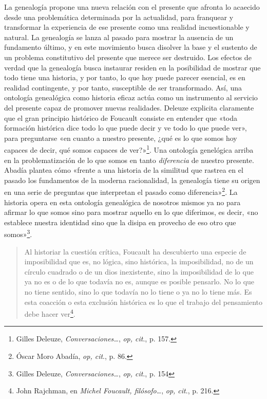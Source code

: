 La genealogía propone una nueva relación con el presente que afronta lo acaecido desde una problemática determinada por la actualidad, para franquear y transformar la experiencia de ese presente como una realidad incuestionable y natural. La genealogía se lanza al pasado para mostrar la ausencia de un fundamento último, y en este movimiento busca disolver la base y el sustento de un problema constitutivo del presente que merece ser destruido. Los efectos de verdad que la genealogía busca instaurar residen en la posibilidad de mostrar que todo tiene una historia, y por tanto, lo que hoy puede parecer esencial, es en realidad contingente, y por tanto, susceptible de ser transformado. Así, una ontología genealógica como historia eficaz actúa como un instrumento al servicio del presente capaz de promover nuevas realidades. Deleuze explicita claramente que el gran principio histórico de Foucault consiste en entender que «toda formación histórica dice todo lo que puede decir y ve todo lo que puede ver», para preguntarse «en cuanto a nuestro presente, ¿qué es lo que somos hoy capaces de decir, qué somos capaces de ver?»\footnote{Gilles Deleuze, \emph{Conversaciones\ldots{}}, \emph{op, cit}., p. 157.}. Una ontología genelógica arriba en la problematización de lo que somos en tanto \emph{diferencia} de nuestro presente. Abadía plantea cómo «frente a una historia de la similitud que rastrea en el pasado los fundamentos de la moderna racionalidad, la genealogía tiene su origen en una serie de preguntas que interpretan el pasado como diferencia»\footnote{Óscar Moro Abadía, \emph{op, cit}., p. 86.}. La historia opera en esta ontología genealógica de nosotros mismos ya no para afirmar lo que somos sino para mostrar aquello en lo que diferimos, es decir, «no establece nuestra identidad sino que la disipa en provecho de eso otro que somos»\footnote{Gilles Deleuze, \emph{Conversaciones\ldots{}}, \emph{op, cit}., p. 154}.

\begin{quote}
Al historiar la cuestión crítica, Foucault ha descubierto una especie de imposibilidad que es, no lógica, sino histórica, la imposibilidad, no de un círculo cuadrado o de un dios inexistente, sino la imposibilidad de lo que ya no es o de lo que todavía no es, aunque es posible pensarlo. No lo que no tiene sentido, sino lo que todavía no lo tiene o ya no lo tiene más. Es esta coacción o esta exclusión histórica es lo que el trabajo del pensamiento debe hacer ver\footnote{John Rajchman, en \emph{Michel Foucault, filósofo\ldots{}}, \emph{op, cit}., p. 216.}.
\end{quote}

